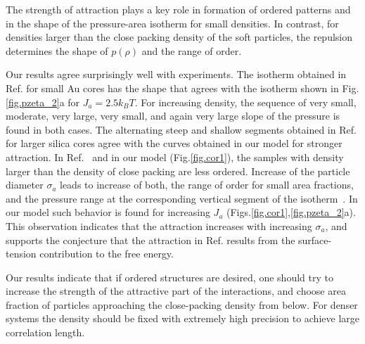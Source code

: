 \documentclass[preprint,
prl,%
aps]{revtex4}
\begin{document}
The strength of attraction plays a key role in  formation of ordered patterns and in the shape of the pressure-area 
isotherm for small densities. 
In contrast,
for densities larger than the close packing density of the soft particles, the repulsion
determines the shape of $p(\rho)$ and the range of order.


Our results agree surprisingly well with experiments. 
 The isotherm obtained in Ref.\cite{vogel:12:0} for small Au cores  has the shape that agrees with
 the isotherm shown in Fig.\ref{fig.pzeta_2}a for $J_a=2.5k_BT$. For increasing density, the sequence of 
   very small,  moderate, very large,  very small, and again very large slope of the pressure is found in both cases.
 The alternating steep and shallow segments obtained in Ref.\cite{rauh:16:0} for larger silica cores 
 agree with the curves obtained in our model for stronger attraction. 
 In Ref.~\cite{rauh:16:0} and in our model (Fig.\ref{fig.cor1}),  the  samples with density
 larger than the density of close packing are less ordered.
Increase of the particle diameter $\sigma_a$ leads 
 to increase of both, the range of order for 
 small area fractions, and the pressure range at the corresponding vertical segment of the isotherm~\cite{rauh:16:0}.
 In our model such behavior is found for increasing $J_a$ (Figs.\ref{fig.cor1},\ref{fig.pzeta_2}a). 
 This observation indicates that the attraction increases with increasing $\sigma_a$, and
 supports the conjecture that the attraction in Ref. \cite{rauh:16:0} results from 
  the surface-tension contribution to the free energy. 
 
   Our results indicate that if ordered structures are desired, one should try to increase the strength 
 of the attractive part of the interactions, and
  choose area fraction of particles approaching the close-packing density from below. 
  For denser systems the density should be fixed with extremely high precision to achieve large correlation length.
 
\end{document}
